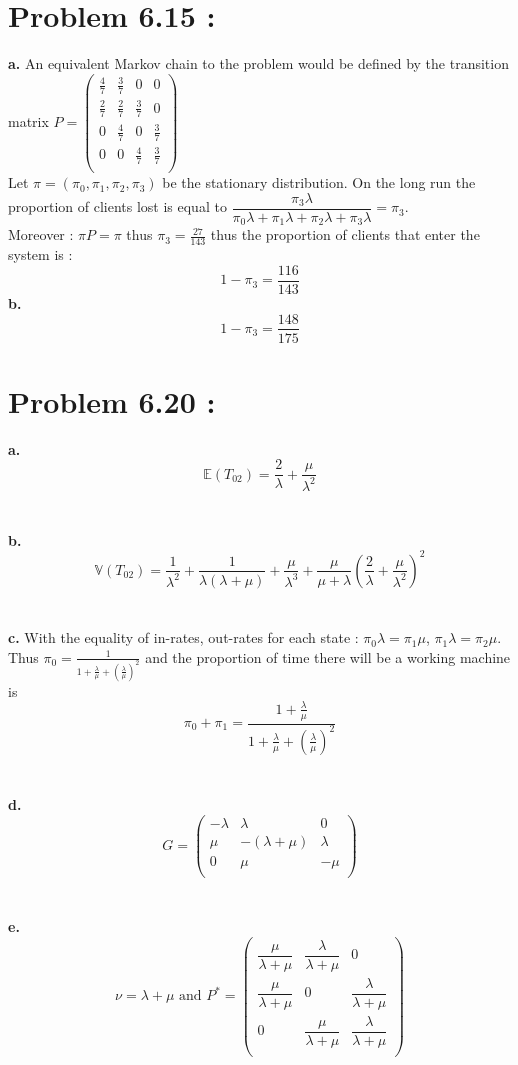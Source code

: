\documentclass{article}
\begin{document}
\section*{Problem 6.15 :}
\textbf{a.} An equivalent Markov chain to the problem would be defined by the transition matrix $P = \left(\begin{array}{cccc}
    \frac{4}{7}&\frac{3}{7}&0&0\\
    \frac{2}{7}&\frac{2}{7}&\frac{3}{7}&0\\
    0&\frac{4}{7}&0&\frac{3}{7}\\
    0&0&\frac{4}{7}&\frac{3}{7}\\
\end{array}\right)$
\\
Let $\pi = (\pi_0,\pi_1,\pi_2,\pi_3)$ be the stationary distribution. On the long run the proportion of clients lost is equal to $\dfrac{\pi_3\lambda}{\pi_0\lambda+\pi_1\lambda+\pi_2\lambda+\pi_3\lambda} = \pi_3$.
\\
Moreover : $\pi P = \pi$ thus $\pi_3 = \frac{27}{143}$ thus the proportion of clients that enter the system is : $$\boxed{1-\pi_3 = \dfrac{116}{143}}$$
\textbf{b.}
$$\boxed{1-\pi_3 = \dfrac{148}{175}}$$
\section*{Problem 6.20 :}
\textbf{a.} $$\boxed{\mathbb{E}(T_{02}) = \dfrac{2}{\lambda}+\dfrac{\mu}{\lambda^2}}$$
\\\\
\textbf{b.} $$\boxed{\mathbb{V}(T_{02}) = \dfrac{1}{\lambda^2}+\dfrac{1}{\lambda(\lambda+\mu)}+\dfrac{\mu}{\lambda^3}+\dfrac{\mu}{\mu+\lambda}(\dfrac{2}{\lambda}+\dfrac{\mu}{\lambda^2})^2}$$
\\\\
\textbf{c.} With the equality of in-rates, out-rates for each state : $\pi_0\lambda = \pi_1\mu$, $\pi_1\lambda = \pi_2\mu$. Thus $\pi_0 = \frac{1}{1+\frac{\lambda}{\mu}+(\frac{\lambda}{\mu})^2}$ and the proportion of time there will be a working machine is $$\boxed{\pi_0+\pi_1 = \dfrac{1+\frac{\lambda}{\mu}}{1+\frac{\lambda}{\mu}+(\frac{\lambda}{\mu})^2}}$$
\\\\
\textbf{d.} $$\boxed{G = \left(\begin{array}{ccc}
    -\lambda& \lambda& 0\\
    \mu&-(\lambda+\mu)&\lambda\\
    0&\mu&-\mu\\
\end{array}\right)}$$
\\\\
\textbf{e.} $$\boxed{\nu = \lambda+\mu\text{ and } P^* = \left(\begin{array}{ccc}
    \dfrac{\mu}{\lambda+\mu}&\dfrac{\lambda}{\lambda+\mu}& 0\\
    \dfrac{\mu}{\lambda+\mu}& 0 & \dfrac{\lambda}{\lambda+\mu}\\
    0&\dfrac{\mu}{\lambda+\mu}&\dfrac{\lambda}{\lambda+\mu}\\
\end{array}\right)}$$
\end{document}
